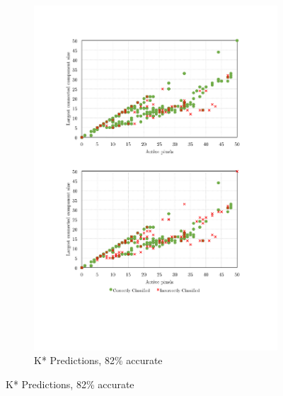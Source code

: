 \documentclass[../thesis/thesis.tex]{subfiles}
\begin{document}
\begin{figure}
\centering
\begin{subfigure}[b]{0.90\textwidth}
\centering
\includegraphics[width=\textwidth]{../diagrams/incorrect-correct-plot-kstar2.pdf}
\caption{K* Predictions, 82\% accurate}
\end{subfigure}


\end{figure}
\end{document}
